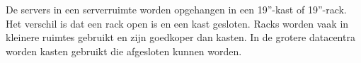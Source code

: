 De servers in een serverruimte worden opgehangen in een 19''-kast of 19''-rack. Het verschil is dat een rack open is en een kast gesloten. Racks worden vaak in kleinere ruimtes gebruikt en zijn goedkoper dan kasten. In de grotere datacentra worden kasten gebruikt die afgesloten kunnen worden.
